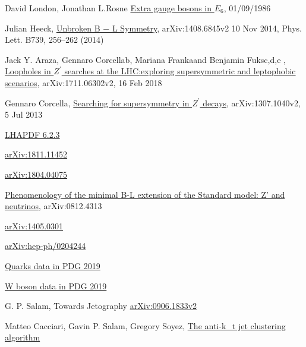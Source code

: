\documentclass[12pt,a4paper]{article}		%
\begin{document}
\begin{thebibliography}{}
	 David London, Jonathan L.Rosne \href{https://journals.aps.org/prd/pdf/10.1103/PhysRevD.34.1530}{Extra gauge bosons in $E_6$}, 01/09/1986
	
	 Julian Heeck, \href{https://arxiv.org/pdf/1408.6845.pdf}{Unbroken B − L Symmetry}, arXiv:1408.6845v2 10 Nov 2014, Phys. Lett. B739, 256–262 (2014) 
	
	 Jack Y. Araza, Gennaro Corcellab, Mariana Frankaand Benjamin Fuksc,d,e , \href{https://arxiv.org/pdf/1711.06302.pdf}{Loopholes in $Z^\prime$ searches at the LHC:exploring supersymmetric and leptophobic scenarios}, arXiv:1711.06302v2, 16 Feb 2018 
	
	 Gennaro Corcella, \href{https://arxiv.org/pdf/1307.1040.pdf}{Searching for supersymmetry in $Z^\prime$ decays}, arXiv:1307.1040v2, 5 Jul 2013
	
	 \href{https://lhapdf.hepforge.org/pdfsets}{LHAPDF 6.2.3}
	
	 \href{https://arxiv.org/abs/1811.11452}{arXiv:1811.11452}
	
	 \href{https://arxiv.org/abs/1804.04075}{arXiv:1804.04075}
	
	 \href{https://arxiv.org/abs/0812.4313}{Phenomenology of the minimal B-L extension of the Standard model: Z' and neutrinos}, arXiv:0812.4313
	
	 \href{https://arxiv.org/abs/1405.0301}{arXiv:1405.0301}
	
	\href{https://arxiv.org/abs/hep-ph/0204244}{arXiv:hep-ph/0204244}
	
	 \href{http://pdg.lbl.gov/2019/tables/rpp2019-sum-quarks.pdf}{Quarks data in PDG 2019}
	
	 \href{http://pdg.lbl.gov/2019/listings/rpp2019-list-w-boson.pdf}{W boson data in PDG 2019}
	
	 G. P. Salam, Towards Jetography \href{https://arxiv.org/abs/0906.1833}{arXiv:0906.1833v2}
	
	 Matteo Cacciari, Gavin P. Salam, Gregory Soyez, \href{https://arxiv.org/abs/0802.1189}{The anti-k_t jet clustering algorithm} 
	
\end{thebibliography} 
\end{document}
